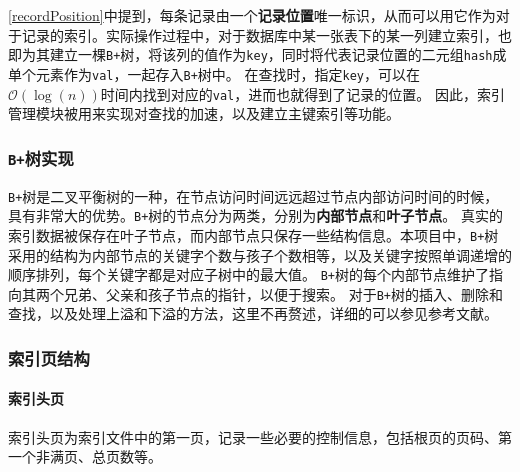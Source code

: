 \documentclass[11pt]{article}
\begin{document}
\ref{recordPosition}中提到，每条记录由一个\textbf{记录位置}唯一标识，从而可以用它作为对于记录的索引。实际操作过程中，对于数据库中某一张表下的某一列建立索引，也即为其建立一棵\texttt{B+}树，将该列的值作为\texttt{key}，同时将代表记录位置的二元组\texttt{hash}成单个元素作为\texttt{val}，一起存入\texttt{B+}树中。
在查找时，指定\texttt{key}，可以在$\mathcal{O}(\log(n))$时间内找到对应的\texttt{val}，进而也就得到了记录的位置。
因此，索引管理模块被用来实现对查找的加速，以及建立主键索引等功能。\\
\subsubsection{\texttt{B+}树实现}
\texttt{B+}树是二叉平衡树的一种，在节点访问时间远远超过节点内部访问时间的时候，具有非常大的优势。\texttt{B+}树的节点分为两类，分别为\textbf{内部节点}和\textbf{叶子节点}。
真实的索引数据被保存在叶子节点，而内部节点只保存一些结构信息。本项目中，\texttt{B+}树采用的结构为内部节点的关键字个数与孩子个数相等，以及关键字按照单调递增的顺序排列，每个关键字都是对应子树中的最大值。
\texttt{B+}树的每个内部节点维护了指向其两个兄弟、父亲和孩子节点的指针，以便于搜索。
对于\texttt{B+}树的插入、删除和查找，以及处理上溢和下溢的方法，这里不再赘述，详细的可以参见参考文献。
\subsubsection{索引页结构}
\paragraph{索引头页} 索引头页为索引文件中的第一页，记录一些必要的控制信息，包括根页的页码、第一个非满页、总页数等。
\end{document}
